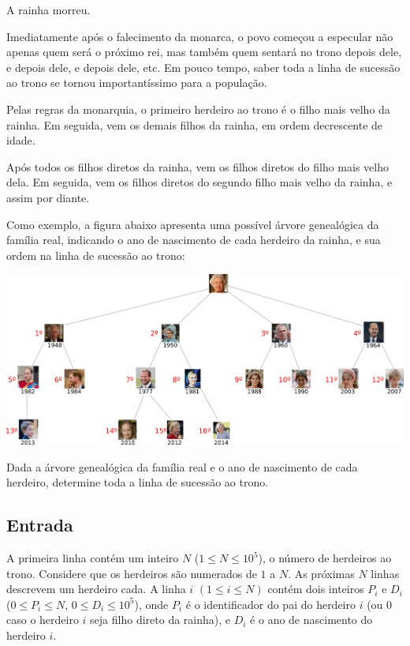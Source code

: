 A rainha morreu.

Imediatamente após o falecimento da monarca, o povo começou a
especular não apenas quem será o próximo rei, mas também quem
sentará no trono depois dele, e depois dele, e depois dele, etc. Em pouco tempo, saber toda a linha de sucessão ao
trono se tornou importantíssimo para a população.

Pelas regras da monarquia, o primeiro herdeiro ao trono é o filho mais
velho da rainha. Em seguida, vem os demais filhos da rainha, em ordem decrescente de
idade.

Após todos os filhos diretos da rainha, vem os filhos diretos do filho mais
velho dela. Em seguida, vem os filhos diretos do segundo filho mais velho da
rainha, e assim por diante.

Como exemplo, a figura abaixo apresenta uma possível árvore genealógica da família real,
indicando o ano de nascimento de cada herdeiro da rainha, e sua ordem na linha
de sucessão ao trono:

\begin{center}
    \includegraphics[scale=0.5]{herdeiros/herdeiros.png}
\end{center}

Dada a árvore genealógica da família real e o ano de nascimento de cada
herdeiro, determine toda a linha de sucessão ao trono.

\subsection*{Entrada}

A primeira linha contém um inteiro $N$ ($1 \leq N \leq 10^5$), o número de
herdeiros ao trono. Considere que os herdeiros são numerados de $1$ a $N$.
As próximas $N$ linhas descrevem um herdeiro cada. A linha $i$ $(1 \leq i \leq
        N)$ contém
dois inteiros $P_i$ e $D_i$ ($0 \leq P_i \leq N$, $0 \leq D_i \leq 10^5$), onde $P_i$ é o identificador do pai do herdeiro $i$ (ou 0 caso
o herdeiro $i$ seja filho direto da rainha), e $D_i$ é o ano de nascimento do
herdeiro $i$.

